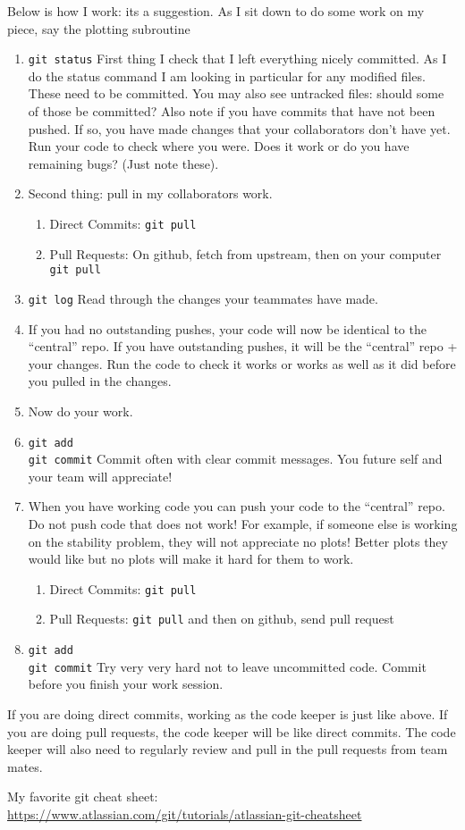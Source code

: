 \documentclass[11pt]{article}
\begin{document}
Below is how I work: its a suggestion. As I sit down to do some work on my piece, say the plotting subroutine
\begin{enumerate}
\item \texttt{git status}  First thing I check that I left everything nicely committed.  As I do the status command I am looking in particular for any modified files. These need to be committed.  You may also see untracked files: should some of those be committed?  Also note if you have commits that have not been pushed.  If so, you have made changes that your collaborators don't have yet.  Run your code to check where you were.  Does it work or do you have remaining bugs?  (Just note these).
\item Second thing: pull in my collaborators work.
\begin{enumerate}
\item Direct Commits: \texttt{git pull}
\item Pull Requests: On github, fetch from upstream, then on your computer \texttt{git pull}
\end{enumerate}
\item \texttt{git log} Read through the changes your teammates have made.
\item If you had no outstanding pushes, your code will now be identical to the ``central'' repo. If you have outstanding pushes, it will be the ``central'' repo + your changes. Run the code to check it works or works as well as it did before you pulled in the changes.
\item Now do your work.
\item \texttt{git add} \\ \texttt{git commit} Commit often with clear commit messages.  You future self and your team will appreciate!
\item When you have working code you can push your code to the ``central'' repo.  Do not push code that does not work!  For example, if someone else is working on the stability problem, they will not appreciate no plots!  Better plots they would like but no plots will make it hard for them to work.
\begin{enumerate}
\item Direct Commits: \texttt{git pull}
\item Pull Requests: \texttt{git pull}  and then on github, send pull request
\end{enumerate}
\item \texttt{git add} \\ \texttt{git commit}  Try very very hard not to leave uncommitted code.  Commit before you finish your work session.
\end{enumerate}

If you are doing direct commits, working as the code keeper is just like above.  If you are doing pull requests, the code keeper will be like direct commits.  The code keeper will also need to regularly review and pull in the pull requests from team mates.

My favorite git cheat sheet:\\
\url{https://www.atlassian.com/git/tutorials/atlassian-git-cheatsheet}
\end{document}
